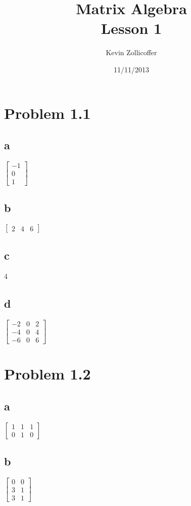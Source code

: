 \documentclass{article}
\author{Kevin Zollicoffer}
\title{Matrix Algebra\\Lesson 1}
\date{11/11/2013}
\begin{document}
\maketitle


\section*{Problem 1.1}
\subsection*{a}
$
\begin{bmatrix}
  -1 \\ 0 \\ 1
\end{bmatrix}
$

\subsection*{b}
$
\begin{bmatrix}
  2 & 4 & 6
\end{bmatrix}
$

\subsection*{c}

4

\subsection*{d}
$
\begin{bmatrix}
  -2 & 0 & 2\\
  -4 & 0 & 4\\
  -6 & 0 & 6
\end{bmatrix}
$

\section*{Problem 1.2}
\subsection*{a}
$
\begin{bmatrix}
  1 & 1 & 1\\
  0 & 1 & 0
\end{bmatrix}
$

\subsection*{b}
$
\begin{bmatrix}
  0 & 0\\
  3 & 1\\
  3 & 1
\end{bmatrix}
$
\end{document}
